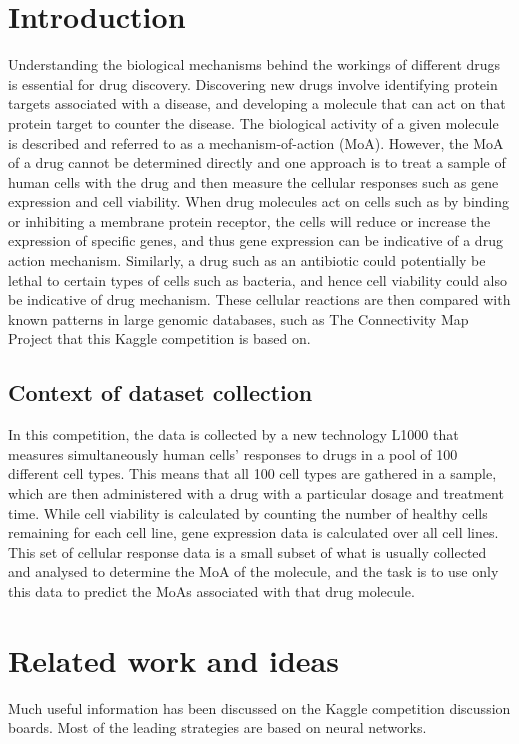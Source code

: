 \documentclass{article}
\begin{document}
\section{Introduction}
Understanding the biological mechanisms behind the workings of different drugs is essential for drug discovery. Discovering new drugs involve identifying protein targets associated with a disease, and developing a molecule that can act on that protein target to counter the disease. The biological activity of a given molecule is described and referred to as a mechanism-of-action (MoA). However, the MoA of a drug cannot be determined directly and one approach is to treat a sample of human cells with the drug and then measure the cellular responses such as gene expression and cell viability. When drug molecules act on cells such as by binding or inhibiting a membrane protein receptor, the cells will reduce or increase the expression of specific genes, and thus gene expression can be indicative of a drug action mechanism. Similarly, a drug such as an antibiotic could potentially be lethal to certain types of cells such as bacteria, and hence cell viability could also be indicative of drug mechanism. These cellular reactions are then compared with known patterns in large genomic databases, such as The Connectivity Map Project that this Kaggle competition is based on. 

\subsection{Context of dataset collection}
In this competition, the data is collected by a new technology L1000 that measures simultaneously human cells' responses to drugs in a pool of 100 different cell types. This means that all 100 cell types are gathered in a sample, which are then administered with a drug with a particular dosage and treatment time. While cell viability is calculated by counting the number of healthy cells remaining for each cell line, gene expression data is calculated over all cell lines. This set of cellular response data is a small subset of what is usually collected and analysed to determine the MoA of the molecule, and the task is to use only this data to predict the MoAs associated with that drug molecule.


\section{Related work and ideas}
Much useful information has been discussed on the Kaggle competition discussion boards. Most of the leading strategies are based on neural networks. 
\end{document}
